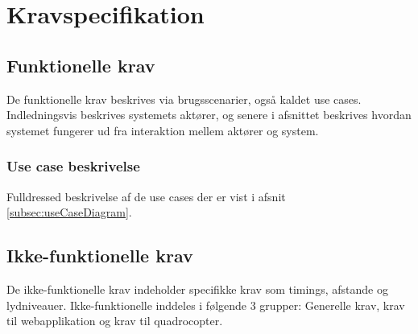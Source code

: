 \chapter{Kravspecifikation}
\label{chap:kravspec}

\section{Funktionelle krav}
\label{sec:funkKrav}
De funktionelle krav beskrives via brugsscenarier, også kaldet use cases. Indledningsvis beskrives systemets aktører, og senere i afsnittet beskrives hvordan systemet fungerer ud fra interaktion mellem aktører og system.

			



\newpage
\subsection{Use case beskrivelse}
\label{subsec:useCaseBeskrivelse}
Fulldressed beskrivelse af de use cases der er vist i afsnit \ref{subsec:useCaseDiagram}. \newline 







\newpage
\section{Ikke-funktionelle krav}
\label{sec:ikkeFunkKrav}
De ikke-funktionelle krav indeholder specifikke krav som timings, afstande og lydniveauer.
Ikke-funktionelle inddeles i følgende 3 grupper: Generelle krav, krav til webapplikation og krav til quadrocopter.\newline



